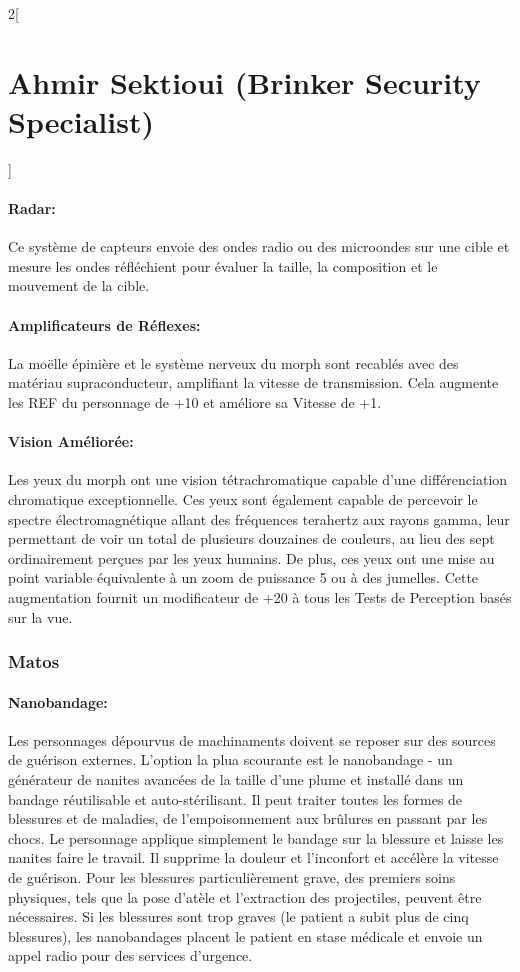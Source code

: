 \documentclass[a4paper,9pt]{article}
\begin{document}
\begin{multicols}{2}[\section*{Ahmir Sektioui (Brinker Security Specialist)}]
   \paragraph{Radar:} Ce système de capteurs envoie des ondes radio ou des microondes
   sur une cible et mesure les ondes réfléchient pour évaluer la taille, la
   composition et le mouvement de la cible.

   \paragraph{Amplificateurs de Réflexes:} La moëlle épinière et le système nerveux
   du morph sont recablés avec des matériau supraconducteur, amplifiant la
   vitesse de transmission. Cela augmente les REF du personnage de +10 et améliore
   sa Vitesse de +1.

   \paragraph{Vision Améliorée:} Les yeux du morph ont une vision tétrachromatique
   capable d'une différenciation chromatique exceptionnelle. Ces yeux sont
   également capable de percevoir le spectre électromagnétique allant des
   fréquences terahertz aux rayons gamma, leur permettant de voir un total de
   plusieurs douzaines de couleurs, au lieu des sept ordinairement perçues par les
   yeux humains. De plus, ces yeux ont une mise au point variable équivalente à un
   zoom de puissance 5 ou à des jumelles. Cette augmentation fournit un
   modificateur de +20 à tous les Tests de Perception basés sur la vue.

   \subsubsection*{Matos}

   \paragraph{Nanobandage:} Les personnages dépourvus de machinaments doivent se
   reposer sur des sources de guérison externes. L'option la plua scourante est
   le nanobandage - un générateur de nanites avancées de la taille d'une plume et
   installé dans un bandage réutilisable et auto-stérilisant. Il peut traiter
   toutes les formes de blessures et de maladies, de l'empoisonnement aux
   brûlures en passant par les chocs. Le personnage applique simplement le
   bandage sur la blessure et laisse les nanites faire le travail. Il supprime
   la douleur et l'inconfort et accélère la vitesse de guérison. Pour les
   blessures particulièrement grave, des premiers soins physiques, tels que la
   pose d'atèle et l'extraction des projectiles, peuvent être nécessaires. Si
   les blessures sont trop graves (le patient a subit plus de cinq blessures),
   les nanobandages placent le patient en stase médicale et envoie un appel
   radio pour des services d'urgence.

\end{multicols}
\end{document}
